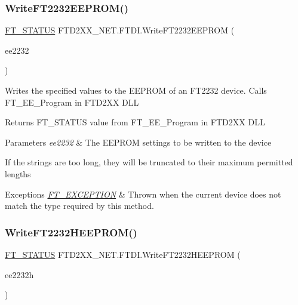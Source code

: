 \subsubsection{\texorpdfstring{WriteFT2232EEPROM()}{WriteFT2232EEPROM()}}
{\footnotesize\ttfamily \mbox{\hyperlink{class_f_t_d2_x_x___n_e_t_1_1_f_t_d_i_aabe20ad905cc4ccc1e35dd5b877d9a83}{F\+T\+\_\+\+S\+T\+A\+T\+US}} F\+T\+D2\+X\+X\+\_\+\+N\+E\+T.\+F\+T\+D\+I.\+Write\+F\+T2232\+E\+E\+P\+R\+OM (\begin{DoxyParamCaption}\item[{\mbox{\hyperlink{class_f_t_d2_x_x___n_e_t_1_1_f_t_d_i_1_1_f_t2232___e_e_p_r_o_m___s_t_r_u_c_t_u_r_e}{F\+T2232\+\_\+\+E\+E\+P\+R\+O\+M\+\_\+\+S\+T\+R\+U\+C\+T\+U\+RE}}}]{ee2232 }\end{DoxyParamCaption})}



Writes the specified values to the E\+E\+P\+R\+OM of an F\+T2232 device. Calls F\+T\+\_\+\+E\+E\+\_\+\+Program in F\+T\+D2\+XX D\+LL 

\begin{DoxyReturn}{Returns}
F\+T\+\_\+\+S\+T\+A\+T\+US value from F\+T\+\_\+\+E\+E\+\_\+\+Program in F\+T\+D2\+XX D\+LL
\end{DoxyReturn}

\begin{DoxyParams}{Parameters}
{\em ee2232} & The E\+E\+P\+R\+OM settings to be written to the device\\
\hline
\end{DoxyParams}


If the strings are too long, they will be truncated to their maximum permitted lengths


\begin{DoxyExceptions}{Exceptions}
{\em \mbox{\hyperlink{class_f_t_d2_x_x___n_e_t_1_1_f_t_d_i_1_1_f_t___e_x_c_e_p_t_i_o_n}{F\+T\+\_\+\+E\+X\+C\+E\+P\+T\+I\+ON}}} & Thrown when the current device does not match the type required by this method.\\
\hline
\end{DoxyExceptions}
\mbox{\label{class_f_t_d2_x_x___n_e_t_1_1_f_t_d_i_a861359cedea2bb55f0b8a787d5e6a8cb}} 
\subsubsection{\texorpdfstring{WriteFT2232HEEPROM()}{WriteFT2232HEEPROM()}}
{\footnotesize\ttfamily \mbox{\hyperlink{class_f_t_d2_x_x___n_e_t_1_1_f_t_d_i_aabe20ad905cc4ccc1e35dd5b877d9a83}{F\+T\+\_\+\+S\+T\+A\+T\+US}} F\+T\+D2\+X\+X\+\_\+\+N\+E\+T.\+F\+T\+D\+I.\+Write\+F\+T2232\+H\+E\+E\+P\+R\+OM (\begin{DoxyParamCaption}\item[{\mbox{\hyperlink{class_f_t_d2_x_x___n_e_t_1_1_f_t_d_i_1_1_f_t2232_h___e_e_p_r_o_m___s_t_r_u_c_t_u_r_e}{F\+T2232\+H\+\_\+\+E\+E\+P\+R\+O\+M\+\_\+\+S\+T\+R\+U\+C\+T\+U\+RE}}}]{ee2232h }\end{DoxyParamCaption})}



